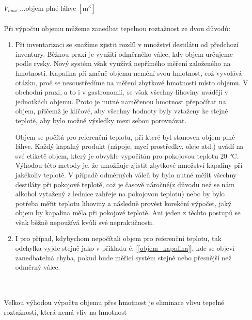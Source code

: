 \(V_{max}\) ...objem plné láhve \([\mathrm{m^3}]\)
\\
\\
Při výpočtu objemu můžeme zanedbat tepelnou roztažnost ze dvou důvodů:
\\
\begin{enumerate}
    \item
    Při inventarizaci se snažíme zjistit rozdíl v množství destilátu od předchozí inventury. Běžnou praxí je využití odměrného válce, kdy objem určujeme podle rysky. Nový systém však využívá nepřímého měření založeného na hmotnosti. Kapalina při změně objemu nemění svou hmotnost, což vyvolává otázku, proč se nesoustředíme na měření zbytkové hmotnosti místo objemu. V obchodní praxi, a to i v gastronomii, se však všechny lihoviny uvádějí v jednotkách objemu. Proto je nutné naměřenou hmotnost přepočítat na objem, přičemž je klíčové, aby všechny hodnoty byly vztaženy ke stejné teplotě, aby bylo možné výsledky mezi sebou porovnávat.
    
    Objem se počítá pro referenční teplotu, při které byl stanoven objem plné láhve. Každý kapalný produkt (nápoje, mycí prostředky, oleje atd.) uvádí na své etiketě objem, který je obvykle vypočítán pro pokojovou teplotu 20 °C. Výhodou této metody je, že umožňuje zjistit zbytkové množství kapaliny při jakékoliv teplotě. V případě odměrných válců by bylo nutné měřit všechny destiláty při pokojové teplotě, což je časově náročné(z důvodu než se nám alkohol vytažený z lednice zahřeje na pokojovou teplotu) nebo by bylo potřeba měřit teplotu lihoviny a následně provést korekční výpočet, jaký objem by kapalina měla při pokojové teplotě. Ani jeden z těchto postupů se však běžně nepoužívá kvůli své nepraktičnosti.
    
    \item 
    I pro případ, kdybychom nepočítali objem pro referenční teplotu, tak odchylka vyjde stejně jako v příkladu č. [\ref{objem_kapalina}], kde se objeví zanedbatelná chyba, pokud bude měřicí systém stejně nebo přesnější než odměrný válec.
\end{enumerate}

\\ 
\\
Velkou výhodou výpočtu objemu přes hmotnost je eliminace vlivu tepelné roztažnosti, která nemá vliv na hmotnost

